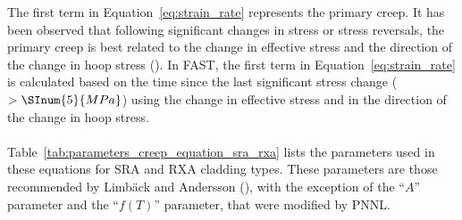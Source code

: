 The first term in Equation~\ref{eq:strain_rate} represents the primary creep. It has been observed
that following significant changes in stress or stress reversals, the primary creep is best related
to the change in effective stress and the direction of the change in hoop stress
(\cite{ref:Geelhood2013}).  In FAST, the first term in Equation~\ref{eq:strain_rate} is
calculated based on the time since the last significant stress change ($> \SInum{5}{MPa}$) using
the change in effective stress and in the direction of the change
in hoop stress.
\\
\\
Table~\ref{tab:parameters_creep_equation_sra_rxa} lists the parameters used in these equations for
SRA and RXA cladding types. These parameters are those recommended by Limb\"{a}ck and Andersson
(\cite{ref:Limback1996a}), with the exception of the ``$A$'' parameter and
the ``$f(T)$'' parameter, that were modified by PNNL.

